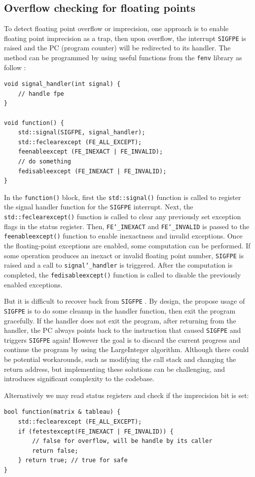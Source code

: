 \documentclass[logo,bsc,singlespacing,parskip]{infthesis}
\newcommand{\sigfpe}{\texttt{SIGFPE} }
\newcommand{\feinexact}{\texttt{FE\char`_INEXACT} }
\newcommand{\feinvalid}{\texttt{FE\char`_INVALID} }
\begin{document}
\subsection{Overflow checking for floating points}
\label{sec:overflow-float}
To detect floating point overflow or imprecision, one approach is to enable
floating point imprecision as a trap, then upon overflow, the interrupt \sigfpe
is raised and the PC (program counter) will be redirected to its handler. The
method can be programmed by using useful functions from the \texttt{fenv}
library as follow \cite{fenvlib}:
\begin{verbatim}
void signal_handler(int signal) {
    // handle fpe
}

void function() {
    std::signal(SIGFPE, signal_handler);
    std::feclearexcept (FE_ALL_EXCEPT);
    feenableexcept (FE_INEXACT | FE_INVALID);
    // do something
    fedisableexcept (FE_INEXACT | FE_INVALID);
}
\end{verbatim}

In the \texttt{function()} block, first the \texttt{std::signal()} function is
called to register the signal handler function for the \sigfpe interrupt. Next,
the \texttt{std::feclearexcept()} function is called to clear any previously set
exception flags in the status register. Then, \feinexact and \feinvalid is
passed to the \texttt{feenableexcept()} function to enable inexactness and
invalid exceptions. Once the floating-point exceptions are enabled, some
computation can be performed. If some operation produces an inexact or invalid
floating point number, \sigfpe is raised and a call to
\texttt{signal\char`_handler} is triggered. After the computation is completed,
the \texttt{fedisableexcept()} function is called to disable the previously
enabled exceptions. 

But it is difficult to recover back from \sigfpe. By design, the propose usage
of \sigfpe is to do some cleanup in the handler function, then exit the program
gracefully. If the handler does not exit the program, after returning from the
handler, the PC always points back to the instruction that caused \sigfpe and
triggers \sigfpe again! However the goal is to discard the current progress and
continue the program by using the LargeInteger algorithm. Although there could
be potential workarounds, such as modifying the call stack and changing the
return address, but implementing these solutions can be challenging, and
introduces significant complexity to the codebase.

Alternatively we may read status registers and check if the imprecision bit is
set: 
\begin{verbatim}
bool function(matrix & tableau) {
    std::feclearexcept (FE_ALL_EXCEPT);
    if (fetestexcept(FE_INEXACT | FE_INVALID)) {
        // false for overflow, will be handle by its caller
        return false; 
    } return true; // true for safe
}
\end{verbatim}
\end{document}
